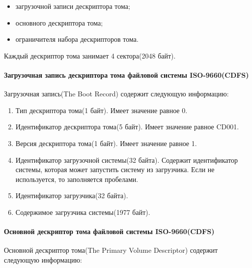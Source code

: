 \begin{itemize}
\item загрузочной записи дескриптора тома;
\item основного дескриптора тома;
\item ограничителя набора дескрипторов тома.
\end{itemize}

Каждый дескриптор тома занимает 4 сектора(2048 байт).

\paragraph{Загрузочная запись дескриптора тома файловой системы ISO-9660(CDFS)}

Загрузочная запись(The Boot Record) содержит следующую информацию:

\begin{enumerate}
\item Тип дескриптора тома(1 байт). Имеет значение равное 0.
\item Идентификатор дескриптора тома(5 байт). Имеет значение равное \textquotedbl CD001\textquotedbl.
\item Версия дескриптора тома(1 байт). Имеет значение равное 1.
\item Идентификатор загрузочной системы(32 байта). Содержит идентификатор системы, которая может запустить систему из загрузчика. Если не используется, то заполняется пробелами.
\item Идентификатор загрузчика(32 байта).
\item Содержимое загрузчика системы(1977 байт). 
\end{enumerate}

\paragraph{Основной дескриптор тома файловой системы ISO-9660(CDFS)}

Основной дескриптор тома(The Primary Volume Descriptor) содержит следующую информацию:

